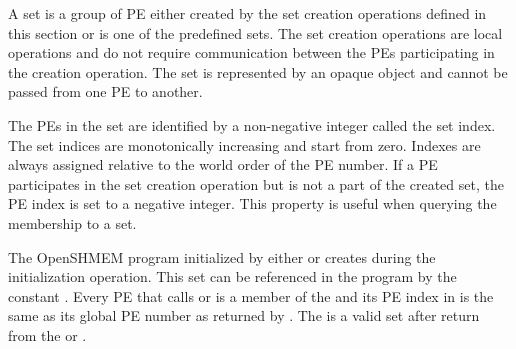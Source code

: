 A set is a group of \ac{PE} either created by the set creation operations defined in this section or is one of the predefined sets. The set creation operations are local operations and do not require communication between the \acp{PE} participating in the creation operation. The set is represented by an opaque object and cannot be passed from one \ac{PE} to another.

The \acp{PE} in the set are identified by a non-negative integer called the set index. The set indices are monotonically increasing and start from zero. Indexes are always assigned relative to the world order of the \ac{PE} number. If a \ac{PE} participates in the set creation operation but is not a part of the created set, the \ac{PE} index is set to a negative integer. This property is useful when querying the membership to a set.

The OpenSHMEM program initialized by either   or   creates  during the initialization operation. This set can be referenced in the program by the constant . Every \ac{PE} that calls   or   is a member of the  and its \ac{PE} index in  is the same as its global \ac{PE} number as returned by  . The  is a valid set after return from the   or  . 
